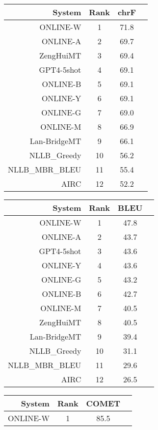 \documentclass[11pt]{article}
\begin{document}
\begin{table}  
\scriptsize\begin{subtable}[t]{0.33\textwidth}
\begin{tabular}{rccc}
\toprule 
System & Rank & chrF \\ 
\midrule 
ONLINE-W & 1 & 71.8 \\ 
ONLINE-A & 2 & 69.7 \\ 
ZengHuiMT & 3 & 69.4 \\ 
GPT4-5shot & 4 & 69.1 \\ 
ONLINE-B & 5 & 69.1 \\ 
ONLINE-Y & 6 & 69.1 \\ 
ONLINE-G & 7 & 69.0 \\ 
ONLINE-M & 8 & 66.9 \\ 
Lan-BridgeMT & 9 & 66.1 \\ 
NLLB\_Greedy & 10 & 56.2 \\ 
NLLB\_MBR\_BLEU & 11 & 55.4 \\ 
AIRC & 12 & 52.2 \\ 
\bottomrule 
\end{tabular} 
\end{subtable} 
\begin{subtable}[t]{0.33\textwidth}
\begin{tabular}{rccc}
\toprule 
System & Rank & BLEU \\ 
\midrule 
ONLINE-W & 1 & 47.8 \\ 
ONLINE-A & 2 & 43.7 \\ 
GPT4-5shot & 3 & 43.6 \\ 
ONLINE-Y & 4 & 43.6 \\ 
ONLINE-G & 5 & 43.2 \\ 
ONLINE-B & 6 & 42.7 \\ 
ONLINE-M & 7 & 40.5 \\ 
ZengHuiMT & 8 & 40.5 \\ 
Lan-BridgeMT & 9 & 39.4 \\ 
NLLB\_Greedy & 10 & 31.1 \\ 
NLLB\_MBR\_BLEU & 11 & 29.6 \\ 
AIRC & 12 & 26.5 \\ 
\bottomrule 
\end{tabular} 
\end{subtable} 
\begin{subtable}[t]{0.33\textwidth}
\begin{tabular}{rccc}
\toprule 
System & Rank & COMET \\ 
\midrule 
ONLINE-W & 1 & 85.5 \\ 

\end{tabular}
\end{subtable}
\end{table}
\end{document}
